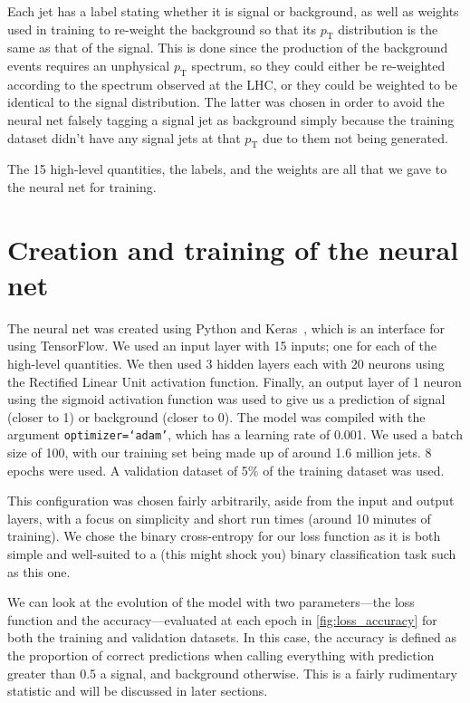 \documentclass[11pt]{article}
\numberwithin{equation}{section}
\numberwithin{figure}{section}
\numberwithin{table}{section}
\begin{document}
Each jet has a label stating whether it is signal or background, as well as weights used in training to re-weight the background so that its $p_\mathrm{T}$ distribution is the same as that of the signal. This is done since the production of the background events requires an unphysical $p_\mathrm{T}$ spectrum, so they could either be re-weighted according to the spectrum observed at the LHC, or they could be weighted to be identical to the signal distribution. The latter was chosen in order to avoid the neural net falsely tagging a signal jet as background simply because the training dataset didn't have any signal jets at that $p_\mathrm{T}$ due to them not being generated. 

The 15 high-level quantities, the labels, and the weights are all that we gave to the neural net for training.

\section{Creation and training of the neural net}\label{sec:CreatingNeuralNet}
The neural net was created using Python and Keras~\cite{keras}, which is an interface for using TensorFlow. We used an input layer with 15 inputs; one for each of the high-level quantities. We then used 3 hidden layers each with 20 neurons using the Rectified Linear Unit activation function. Finally, an output layer of 1 neuron using the sigmoid activation function was used to give us a prediction of signal (closer to 1) or background (closer to 0). The model was compiled with the argument \texttt{optimizer=`adam'}, which has a learning rate of 0.001. We used a batch size of 100, with our training set being made up of around 1.6 million jets. 8 epochs were used. A validation dataset of 5\% of the training dataset was used.

This configuration was chosen fairly arbitrarily, aside from the input and output layers, with a focus on simplicity and short run times (around 10 minutes of training). We chose the binary cross-entropy for our loss function as it is both simple and well-suited to a (this might shock you) binary classification task such as this one.

We can look at the evolution of the model with two parameters---the loss function and the accuracy---evaluated at each epoch in \cref{fig:loss_accuracy} for both the training and validation datasets. In this case, the accuracy is defined as the proportion of correct predictions when calling everything with prediction greater than 0.5 a signal, and background otherwise. This is a fairly rudimentary statistic and will be discussed in later sections.
\end{document}
